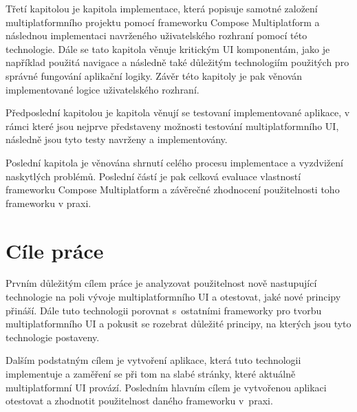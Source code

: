 \medskip

Třetí kapitolou je kapitola implementace, která popisuje samotné založení multiplatformního projektu pomocí frameworku Compose Multiplatform
a následnou implementaci navrženého uživatelského rozhraní pomocí této technologie. Dále se tato kapitola věnuje kritickým UI komponentám,
jako je například použitá navigace a následně také důležitým technologiím použitých pro správné fungování aplikační logiky. Závěr této kapitoly
je pak věnován implementované logice uživatelského rozhraní.

\medskip

Předposlední kapitolou je kapitola věnují se testovaní implementované aplikace, v rámci které jsou nejprve představeny možnosti testování
multiplatformního UI, následně jsou tyto testy navrženy a implementovány.


\medskip


Poslední kapitola je věnována shrnutí celého procesu implementace a vyzdvižení naskytlých problémů. Poslední částí je pak celková evaluace
vlastností frameworku Compose Multiplatform a závěrečné zhodnocení použitelnosti toho frameworku v praxi.

\newpage

\section{Cíle práce} \label{goals}
Prvním důležitým cílem práce je analyzovat použitelnost nově nastupující technologie na poli vývoje multiplatformního UI a otestovat, jaké
nové principy přináší. Dále tuto technologii porovnat s~ostatními frameworky pro tvorbu multiplatformního UI a pokusit se
rozebrat důležité principy, na kterých jsou tyto technologie postaveny. 

Dalším podstatným cílem je vytvoření aplikace, která tuto technologii implementuje a zaměření se při tom na slabé stránky, 
které aktuálně multiplatformní UI provází. 
Posledním hlavním cílem je vytvořenou aplikaci otestovat a zhodnotit použitelnost daného frameworku v~praxi.

